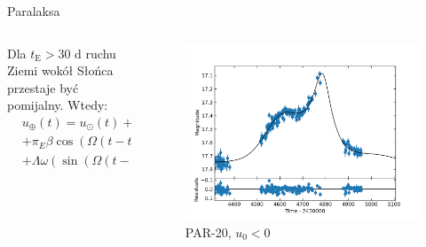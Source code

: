 \documentclass{beamer}
\begin{document}
\begin{frame}{Paralaksa}
    \begin{columns}
        \begin{column}{0.4\linewidth}
            Dla $t_{\text{E}}>30 \text{ d}$ ruchu Ziemi wokół Słońca przestaje być pomijalny. Wtedy:
            \begin{align*}
                 & u_{\oplus}(t) = u_{\odot}(t)+ \\&+\pi_{E}\beta\cos(\Omega(t-t_0)+\varphi)+\\&+\Lambda \omega(\sin(\Omega(t-t0)+\varphi))
            \end{align*}

        \end{column}

        \begin{column}{0.5\linewidth}
            \begin{figure}
                \centering
                \includegraphics[width = \textwidth]{../sim30/parallax/png/PAR-20-noaver.dat-.png}
                \caption*{\tiny{PAR-20, $u_0<0$}}
            \end{figure}
        \end{column}
    \end{columns}

\end{frame}
\end{document}
